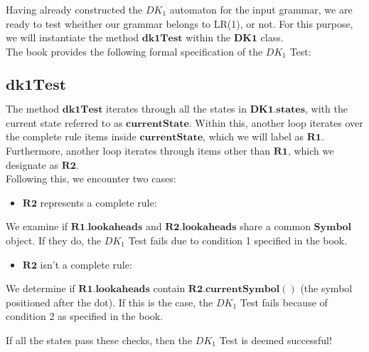 Having already constructed the \(DK_{1}\) automaton for the input grammar, we are ready to test wheither our grammar belongs to LR(1), or not. For this purpose, we will instantiate the method \(\boldsymbol{dk1Test}\) within the \(\boldsymbol{DK1}\) class.\\

The book provides the following formal specification of the \(DK_{1}\) Test:


\vspace{20pt}

\subsection*{\(\boldsymbol{dk1Test}\)}

The method \(\boldsymbol{dk1Test}\) iterates through all the states in \(\boldsymbol{DK1.states}\), with the current state referred to as \(\boldsymbol{currentState}\). Within this, another loop iterates over the complete rule items inside \(\boldsymbol{currentState}\), which we will label as \(\boldsymbol{R1}\). Furthermore, another loop iterates through items other than \(\boldsymbol{R1}\), which we designate as \(\boldsymbol{R2}\).\\

Following this, we encounter two cases:
\begin{itemize}
    \item \(\boldsymbol{R2}\) represents a complete rule:
\end{itemize}

We examine if \(\boldsymbol{R1.lookaheads}\) and \(\boldsymbol{R2.lookaheads}\) share a common \(\boldsymbol{Symbol}\) object. If they do, the \(DK_{1}\) Test fails due to condition 1 specified in the book.

\begin{itemize}
    \item \(\boldsymbol{R2}\) isn't a complete rule:
\end{itemize}

We determine if \(\boldsymbol{R1.lookaheads}\) contain \(\boldsymbol{R2.currentSymbol()}\) (the symbol positioned after the dot). If this is the case, the \(DK_{1}\) Test fails because of condition 2 as specified in the book.

If all the states pass these checks, then the \(DK_{1}\) Test is deemed successful!\\

